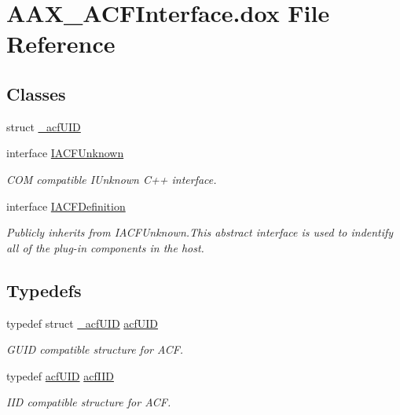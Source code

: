 \hypertarget{a00150}{}\section{A\+A\+X\+\_\+\+A\+C\+F\+Interface.\+dox File Reference}
\label{a00150}
\subsection*{Classes}
\begin{DoxyCompactItemize}
\item 
struct \hyperlink{a00008}{\+\_\+acf\+U\+I\+D}
\item 
interface \hyperlink{a00146}{I\+A\+C\+F\+Unknown}
\begin{DoxyCompactList}\small\item\em C\+O\+M compatible I\+Unknown C++ interface. \end{DoxyCompactList}\item 
interface \hyperlink{a00145}{I\+A\+C\+F\+Definition}
\begin{DoxyCompactList}\small\item\em Publicly inherits from I\+A\+C\+F\+Unknown.\+This abstract interface is used to indentify all of the plug-\/in components in the host. \end{DoxyCompactList}\end{DoxyCompactItemize}
\subsection*{Typedefs}
\begin{DoxyCompactItemize}
\item 
typedef struct \hyperlink{a00008}{\+\_\+acf\+U\+I\+D} \hyperlink{a00150_ab19414382287ff80930c48a196145214}{acf\+U\+I\+D}
\begin{DoxyCompactList}\small\item\em G\+U\+I\+D compatible structure for A\+C\+F. \end{DoxyCompactList}\item 
typedef \hyperlink{a00150_ab19414382287ff80930c48a196145214}{acf\+U\+I\+D} \hyperlink{a00150_a59df0b41744eee7a066787aaedf97f67}{acf\+I\+I\+D}
\begin{DoxyCompactList}\small\item\em I\+I\+D compatible structure for A\+C\+F. \end{DoxyCompactList}\end{DoxyCompactItemize}


